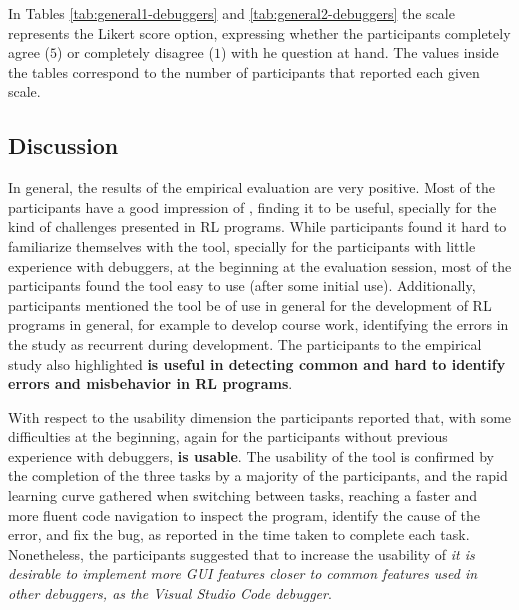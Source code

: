 % 

In Tables \ref{tab:general1-debuggers} and \ref{tab:general2-debuggers} the scale represents the 
Likert score option, expressing whether the participants completely agree ($5$) or completely disagree 
($1$) with he question at hand. The values inside the tables correspond to the number of participants 
that reported each given scale.

\subsection{Discussion}
\label{sec:discussion}

In general, the results of the empirical evaluation are very positive. Most of the participants have a 
good impression of \flik, finding it to be useful, specially for the kind of challenges presented in 
\ac{RL} programs. While participants found it hard to familiarize themselves with the tool, specially 
for the participants with little experience with debuggers, at the beginning at the evaluation session, 
most of the participants found the tool easy to use (after some initial use). Additionally, participants 
mentioned the tool be of use in general for the development of \ac{RL} programs in general, for example 
to develop course work, identifying the errors in the study as recurrent during development. The 
participants to the empirical study  also highlighted \textbf{\flik is useful in detecting common and hard to identify errors and misbehavior in \ac{RL} programs}.

With respect to the usability dimension the participants reported that, with some difficulties at the 
beginning, again for the participants without previous experience with debuggers, 
\textbf{\flik is usable}. The usability of the tool is confirmed by the completion of the three tasks by a 
majority of the participants, and the rapid learning curve gathered when switching between tasks, 
reaching a faster and more fluent code navigation to inspect the program, identify the cause of the 
error, and fix the bug, as reported in the time taken to complete each task. Nonetheless, the 
participants suggested that to increase the usability of \flik \textit{it is desirable to implement more GUI 
features closer to common features used in other debuggers, as the Visual Studio Code debugger}.


\endinput


